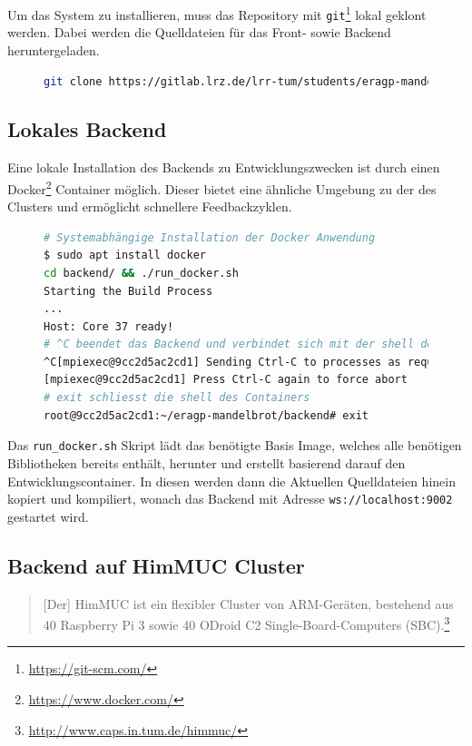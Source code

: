 Um das System zu installieren, muss das Repository mit \verb|git|\footnote{\url{https://git-scm.com/}} lokal geklont werden. Dabei werden die Quelldateien für
das Front- sowie Backend heruntergeladen.

\begin{figure}[h!]
	\begin{lstlisting}[language=bash, caption={Klonen des Repositorys}]
git clone https://gitlab.lrz.de/lrr-tum/students/eragp-mandelbrot.git
        \end{lstlisting}
\end{figure}

\subsection{Lokales Backend}
Eine lokale Installation des Backends zu Entwicklungszwecken ist durch einen Docker\footnote{\url{https://www.docker.com/}} Container möglich.
Dieser bietet eine ähnliche Umgebung zu der des Clusters und ermöglicht schnellere Feedbackzyklen.

\begin{figure}[h!]
	\begin{lstlisting}[language=bash, caption={Starten der Entwicklungsumbegung des Backends}]
# Systemabhängige Installation der Docker Anwendung
$ sudo apt install docker
cd backend/ && ./run_docker.sh
Starting the Build Process
...
Host: Core 37 ready!
# ^C beendet das Backend und verbindet sich mit der shell des Containers
^C[mpiexec@9cc2d5ac2cd1] Sending Ctrl-C to processes as requested
[mpiexec@9cc2d5ac2cd1] Press Ctrl-C again to force abort
# exit schliesst die shell des Containers
root@9cc2d5ac2cd1:~/eragp-mandelbrot/backend# exit
        \end{lstlisting}
\end{figure}

Das \verb|run_docker.sh| Skript lädt das benötigte Basis Image, welches alle benötigen Bibliotheken bereits enthält, herunter und erstellt basierend darauf
den Entwicklungscontainer. In diesen werden dann die Aktuellen Quelldateien hinein kopiert und kompiliert, wonach das Backend mit Adresse
\verb|ws://localhost:9002| gestartet wird.

\subsection{Backend auf HimMUC Cluster}

\begin{quotation}
	[Der] HimMUC ist ein flexibler Cluster von ARM-Geräten, bestehend aus 40 Raspberry Pi 3 sowie 40 ODroid C2 Single-Board-Computers (SBC).\footnote{\url{http://www.caps.in.tum.de/himmuc/}}
\end{quotation}

